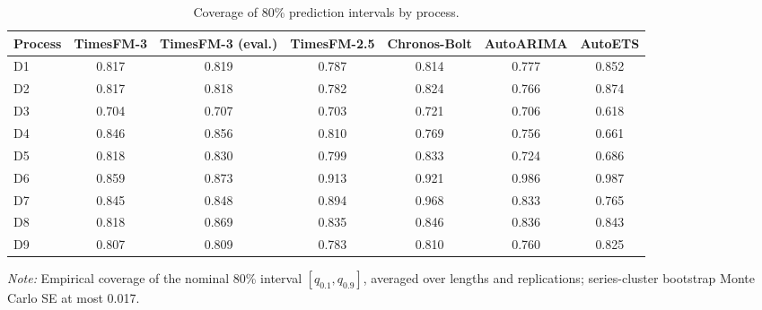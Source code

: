\begin{table}[!htbp]
\centering
\begin{threeparttable}
\caption{Coverage of 80\% prediction intervals by process.}
\label{tab:si-coverage}
\small\setlength{\tabcolsep}{4pt}
\begin{tabular}{lcccccc}
\toprule
Process & TimesFM-3 & TimesFM-3 (eval.) & TimesFM-2.5 & Chronos-Bolt & AutoARIMA & AutoETS \\
\midrule
D1 & 0.817 & 0.819 & 0.787 & 0.814 & 0.777 & 0.852 \\
D2 & 0.817 & 0.818 & 0.782 & 0.824 & 0.766 & 0.874 \\
D3 & 0.704 & 0.707 & 0.703 & 0.721 & 0.706 & 0.618 \\
D4 & 0.846 & 0.856 & 0.810 & 0.769 & 0.756 & 0.661 \\
D5 & 0.818 & 0.830 & 0.799 & 0.833 & 0.724 & 0.686 \\
D6 & 0.859 & 0.873 & 0.913 & 0.921 & 0.986 & 0.987 \\
D7 & 0.845 & 0.848 & 0.894 & 0.968 & 0.833 & 0.765 \\
D8 & 0.818 & 0.869 & 0.835 & 0.846 & 0.836 & 0.843 \\
D9 & 0.807 & 0.809 & 0.783 & 0.810 & 0.760 & 0.825 \\
\bottomrule
\end{tabular}
\begin{tablenotes}[flushleft]\footnotesize
\item \textit{Note:} Empirical coverage of the nominal 80\% interval $[q_{0.1}, q_{0.9}]$, averaged over lengths and replications; series-cluster bootstrap Monte Carlo SE at most 0.017.
\end{tablenotes}
\end{threeparttable}
\end{table}
